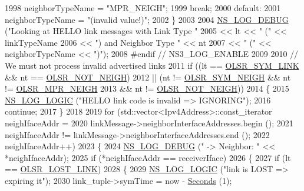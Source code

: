 \begin{DoxyCode}
1998           neighborTypeName = \textcolor{stringliteral}{"MPR\_NEIGH"};
1999           \textcolor{keywordflow}{break};
2000         \textcolor{keywordflow}{default}:
2001           neighborTypeName = \textcolor{stringliteral}{"(invalid value!)"};
2002         \}
2003 
2004       \hyperlink{group__logging_ga413f1886406d49f59a6a0a89b77b4d0a}{NS\_LOG\_DEBUG} (\textcolor{stringliteral}{"Looking at HELLO link messages with Link Type "}
2005                     << lt << \textcolor{stringliteral}{" ("} << linkTypeName
2006                     << \textcolor{stringliteral}{") and Neighbor Type "} << nt
2007                     << \textcolor{stringliteral}{" ("} << neighborTypeName << \textcolor{stringliteral}{")"});
2008 \textcolor{preprocessor}{#endif // NS3\_LOG\_ENABLE}
2009 
2010       \textcolor{comment}{// We must not process invalid advertised links}
2011       \textcolor{keywordflow}{if} ((lt == \hyperlink{olsr-routing-protocol_8cc_aa7acefeda0e22f22d9ca6b9f445859d7}{OLSR\_SYM\_LINK} && nt == \hyperlink{olsr-routing-protocol_8cc_a7ff690f7463019aec83c1f0edd911034}{OLSR\_NOT\_NEIGH})
2012           || (nt != \hyperlink{olsr-routing-protocol_8cc_a46286c316da9922151b354295e71d35a}{OLSR\_SYM\_NEIGH} && nt != \hyperlink{olsr-routing-protocol_8cc_a08fbe0b4c74b944f681630df4fa0fd82}{OLSR\_MPR\_NEIGH}
2013               && nt != \hyperlink{olsr-routing-protocol_8cc_a7ff690f7463019aec83c1f0edd911034}{OLSR\_NOT\_NEIGH}))
2014         \{
2015           \hyperlink{group__logging_ga88acd260151caf2db9c0fc84997f45ce}{NS\_LOG\_LOGIC} (\textcolor{stringliteral}{"HELLO link code is invalid => IGNORING"});
2016           \textcolor{keywordflow}{continue};
2017         \}
2018 
2019       \textcolor{keywordflow}{for} (std::vector<Ipv4Address>::const\_iterator neighIfaceAddr =
2020              linkMessage->neighborInterfaceAddresses.begin ();
2021            neighIfaceAddr != linkMessage->neighborInterfaceAddresses.end ();
2022            neighIfaceAddr++)
2023         \{
2024           \hyperlink{group__logging_ga413f1886406d49f59a6a0a89b77b4d0a}{NS\_LOG\_DEBUG} (\textcolor{stringliteral}{"   -> Neighbor: "} << *neighIfaceAddr);
2025           \textcolor{keywordflow}{if} (*neighIfaceAddr == receiverIface)
2026             \{
2027               \textcolor{keywordflow}{if} (lt == \hyperlink{olsr-routing-protocol_8cc_ab230470cf0b3270a8bba72a05501dd8d}{OLSR\_LOST\_LINK})
2028                 \{
2029                   \hyperlink{group__logging_ga88acd260151caf2db9c0fc84997f45ce}{NS\_LOG\_LOGIC} (\textcolor{stringliteral}{"link is LOST => expiring it"});
2030                   link\_tuple->symTime = now - \hyperlink{group__timecivil_ga33c34b816f8ff6628e33d5c8e9713b9e}{Seconds} (1);

\end{DoxyCode}
